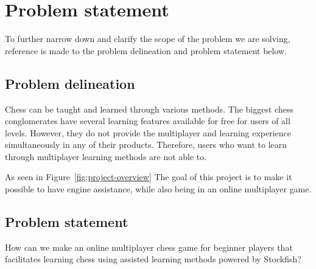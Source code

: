 \chapter{Problem statement}\label{ch:problem-statement}

To further narrow down and clarify the scope of the problem we are solving, reference is made to the problem delineation
and problem statement below.



\section{Problem delineation}\label{sec:problem-delineation}

Chess can be taught and learned through various methods.
The biggest chess conglomerates have several learning features available for free for users of all levels.
However, they do not provide the multiplayer and learning experience simultaneously in any of their products.
Therefore, users who want to learn through multiplayer learning methods are not able to.

As seen in Figure~\ref{fig:project-overview} The goal of this project is to make it possible to have engine
assistance, while also being in an online multiplayer game.



\section{Problem statement}\label{sec:problem-statement}

\begin{tcolorbox}
    How can we make an online multiplayer chess game for beginner players that facilitates learning chess using
    assisted learning methods powered by Stockfish?
\end{tcolorbox}
